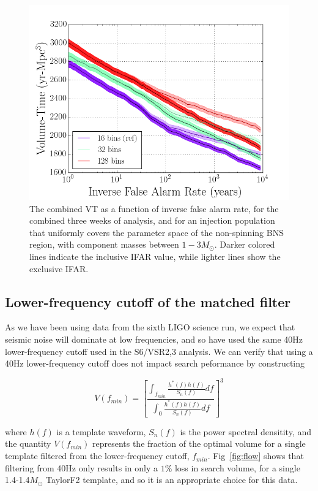 \begin{figure}
\centering
\includegraphics[width=1.0\textwidth]{papers/bns_o1_dev/figures/chisq_combined.png}
\caption{\label{fig:fchisq} 
The combined VT as a function of inverse false alarm rate, for the combined three weeks of analysis, and for an injection population that uniformly covers the parameter space of the non-spinning BNS region, with component masses between $1- 3M_\odot$. Darker colored lines indicate the inclusive IFAR value, while lighter lines show the exclusive IFAR. 
}
\end{figure}

\subsection{Lower-frequency cutoff of the matched filter}

As we have been using data from the sixth LIGO science run, we expect that seismic noise will dominate at low frequencies, and so have used the same 40Hz lower-frequency cutoff used in the S6/VSR2,3 analysis. We can verify that using a 40Hz lower-frequency cutoff does not impact search peformance by constructing

\begin{equation}
V(f_{min}) = \left[ \frac{\int_{f_{min}} \frac{h^{*}(f)h(f)}{S_n(f)} df}{\int_{0} \frac{h^*(f)h(f)}{S_n(f)} df} \right]^3
\end{equation}

where $h(f)$ is a template waveform, $S_n(f)$ is the power spectral densitity, and the quantity $V(f_{min})$ represents the fraction of the optimal volume for a single template
filtered from the lower-frequency cutoff, $f_{min}$. Fig~\ref{fig:flow} shows that filtering from 40Hz only results in only a $1\%$ loss in search volume, for a single 1.4-1.4$M_\odot$ TaylorF2 template, and so it is an appropriate choice for this data.

